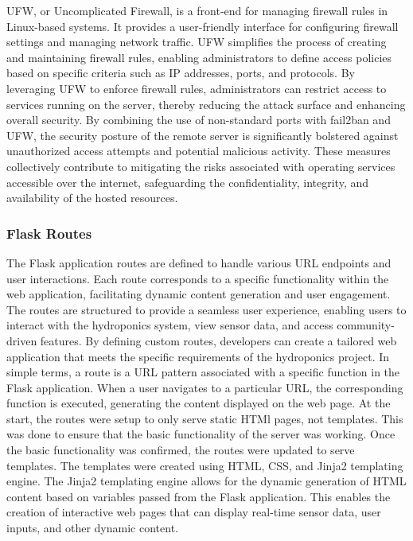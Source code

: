 \documentclass[12pt]{article}
\begin{document}
\newline
\noindent UFW, or Uncomplicated Firewall, is a front-end for managing firewall rules in Linux-based systems. It provides a user-friendly interface for configuring firewall settings and managing network traffic. UFW simplifies the process of creating and maintaining firewall rules, enabling administrators to define access policies based on specific criteria such as IP addresses, ports, and protocols. By leveraging UFW to enforce firewall rules, administrators can restrict access to services running on the server, thereby reducing the attack surface and enhancing overall security.
\newline
\newline
\noindent By combining the use of non-standard ports with fail2ban and UFW, the security posture of the remote server is significantly bolstered against unauthorized access attempts and potential malicious activity. These measures collectively contribute to mitigating the risks associated with operating services accessible over the internet, safeguarding the confidentiality, integrity, and availability of the hosted resources.
\newline
\newline
\subsubsection{Flask Routes}
\noindent The Flask application routes are defined to handle various URL endpoints and user interactions. Each route corresponds to a specific functionality within the web application, facilitating dynamic content generation and user engagement. The routes are structured to provide a seamless user experience, enabling users to interact with the hydroponics system, view sensor data, and access community-driven features. By defining custom routes, developers can create a tailored web application that meets the specific requirements of the hydroponics project.
In simple terms, a route is a URL pattern associated with a specific function in the Flask application. When a user navigates to a particular URL, the corresponding function is executed, generating the content displayed on the web page.
\newline
\newline
\noindent At the start, the routes were setup to only serve static HTMl pages, not templates. This was done to ensure that the basic functionality of the server was working. Once the basic functionality was confirmed, the routes were updated to serve templates. The templates were created using HTML, CSS, and Jinja2 templating engine. The Jinja2 templating engine allows for the dynamic generation of HTML content based on variables passed from the Flask application. This enables the creation of interactive web pages that can display real-time sensor data, user inputs, and other dynamic content.
\newline
\newline
\end{document}

